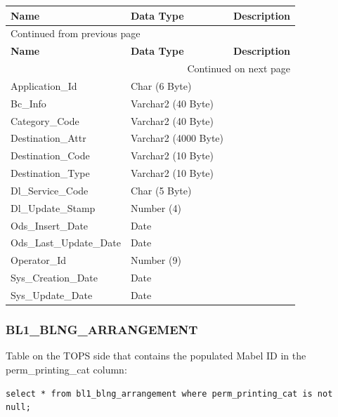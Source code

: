 \documentclass[12pt,twoside]{article}
\begin{document}
\begin{longtable}{l|l|l}
\hline
\textbf{Name} & \textbf{Data Type} & \textbf{Description}\\
\hline
\endfirsthead
\multicolumn{3}{l}{Continued from previous page} \\
\hline

\textbf{Name} & \textbf{Data Type} & \textbf{Description} \\

\hline
\endhead
\hline\multicolumn{3}{r}{Continued on next page} \\
\endfoot
\endlastfoot
\hline
Application\_Id & Char (6 Byte) & \\
Bc\_Info & Varchar2 (40 Byte) & \\
Category\_Code & Varchar2 (40 Byte) & \\
Destination\_Attr & Varchar2 (4000 Byte) & \\
Destination\_Code & Varchar2 (10 Byte) & \\
Destination\_Type & Varchar2 (10 Byte) & \\
Dl\_Service\_Code & Char (5 Byte) & \\
Dl\_Update\_Stamp & Number (4) & \\
Ods\_Insert\_Date & Date & \\
Ods\_Last\_Update\_Date & Date & \\
Operator\_Id & Number (9) & \\
Sys\_Creation\_Date & Date & \\
Sys\_Update\_Date & Date & \\
\hline
\end{longtable}

\normalsize

\subsubsection{BL1\_BLNG\_ARRANGEMENT}
\label{sec:orgheadline151}
Table on the TOPS side that contains the populated Mabel ID 
in the perm\_printing\_cat column:
\begin{verbatim}
select * from bl1_blng_arrangement where perm_printing_cat is not null;
\end{verbatim}
\end{document}
